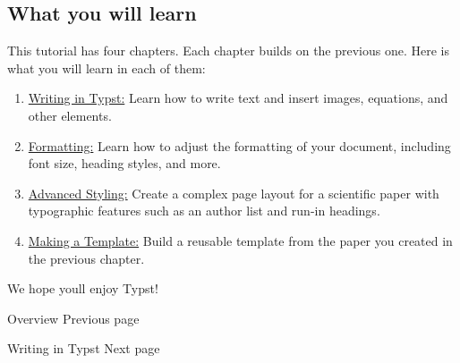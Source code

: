 \subsection{What you will learn}\label{learnings}

This tutorial has four chapters. Each chapter builds on the previous
one. Here is what you will learn in each of them:

\begin{enumerate}
\tightlist
\item
  \href{/docs/tutorial/writing-in-typst/}{Writing in Typst:} Learn how
  to write text and insert images, equations, and other elements.
\item
  \href{/docs/tutorial/formatting/}{Formatting:} Learn how to adjust the
  formatting of your document, including font size, heading styles, and
  more.
\item
  \href{/docs/tutorial/advanced-styling/}{Advanced Styling:} Create a
  complex page layout for a scientific paper with typographic features
  such as an author list and run-in headings.
\item
  \href{/docs/tutorial/making-a-template/}{Making a Template:} Build a
  reusable template from the paper you created in the previous chapter.
\end{enumerate}

We hope you\textquotesingle ll enjoy Typst!

\href{/docs/}{\pandocbounded{}}

{ Overview } { Previous page }

\href{/docs/tutorial/writing-in-typst/}{\pandocbounded{}}

{ Writing in Typst } { Next page }
